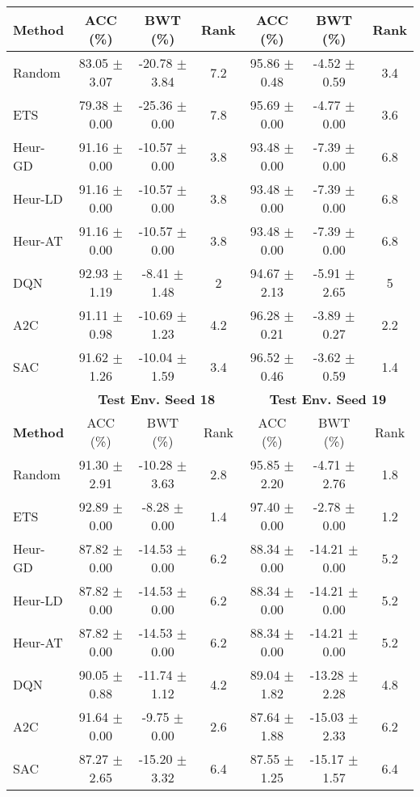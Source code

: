 \begin{tabular}{lcccccc}
	\cmidrule(lr){2-4} \cmidrule(lr){5-7}
	\textbf{Method} & ACC (\%)          & BWT (\%)          & Rank   & ACC (\%)          & BWT (\%)          & Rank   \\
	\midrule 
	Random          & 83.05 $\pm$ 3.07    & -20.78 $\pm$ 3.84   & 7.2    & 95.86 $\pm$ 0.48    & -4.52 $\pm$ 0.59    & 3.4    \\
	ETS             & 79.38 $\pm$ 0.00    & -25.36 $\pm$ 0.00   & 7.8    & 95.69 $\pm$ 0.00    & -4.77 $\pm$ 0.00    & 3.6    \\
	Heur-GD         & 91.16 $\pm$ 0.00    & -10.57 $\pm$ 0.00   & 3.8    & 93.48 $\pm$ 0.00    & -7.39 $\pm$ 0.00    & 6.8    \\
	Heur-LD         & 91.16 $\pm$ 0.00    & -10.57 $\pm$ 0.00   & 3.8    & 93.48 $\pm$ 0.00    & -7.39 $\pm$ 0.00    & 6.8    \\
	Heur-AT         & 91.16 $\pm$ 0.00    & -10.57 $\pm$ 0.00   & 3.8    & 93.48 $\pm$ 0.00    & -7.39 $\pm$ 0.00    & 6.8    \\
	DQN             & 92.93 $\pm$ 1.19    & -8.41 $\pm$ 1.48    & 2      & 94.67 $\pm$ 2.13    & -5.91 $\pm$ 2.65    & 5      \\
	A2C             & 91.11 $\pm$ 0.98    & -10.69 $\pm$ 1.23   & 4.2    & 96.28 $\pm$ 0.21    & -3.89 $\pm$ 0.27    & 2.2    \\
	SAC             & 91.62 $\pm$ 1.26    & -10.04 $\pm$ 1.59   & 3.4    & 96.52 $\pm$ 0.46    & -3.62 $\pm$ 0.59    & 1.4    \\
	\midrule 
	& \multicolumn{3}{c}{\textbf{Test Env. Seed 18}} & \multicolumn{3}{c}{\textbf{Test Env. Seed 19}} \\
	\cmidrule(lr){2-4} \cmidrule(lr){5-7}
	\textbf{Method} & ACC (\%)          & BWT (\%)          & Rank   & ACC (\%)          & BWT (\%)          & Rank   \\
	\midrule 
	Random          & 91.30 $\pm$ 2.91    & -10.28 $\pm$ 3.63   & 2.8    & 95.85 $\pm$ 2.20    & -4.71 $\pm$ 2.76    & 1.8    \\
	ETS             & 92.89 $\pm$ 0.00    & -8.28 $\pm$ 0.00    & 1.4    & 97.40 $\pm$ 0.00    & -2.78 $\pm$ 0.00    & 1.2    \\
	Heur-GD         & 87.82 $\pm$ 0.00    & -14.53 $\pm$ 0.00   & 6.2    & 88.34 $\pm$ 0.00    & -14.21 $\pm$ 0.00   & 5.2    \\
	Heur-LD         & 87.82 $\pm$ 0.00    & -14.53 $\pm$ 0.00   & 6.2    & 88.34 $\pm$ 0.00    & -14.21 $\pm$ 0.00   & 5.2    \\
	Heur-AT         & 87.82 $\pm$ 0.00    & -14.53 $\pm$ 0.00   & 6.2    & 88.34 $\pm$ 0.00    & -14.21 $\pm$ 0.00   & 5.2    \\
	DQN             & 90.05 $\pm$ 0.88    & -11.74 $\pm$ 1.12   & 4.2    & 89.04 $\pm$ 1.82    & -13.28 $\pm$ 2.28   & 4.8    \\
	A2C             & 91.64 $\pm$ 0.00    & -9.75 $\pm$ 0.00    & 2.6    & 87.64 $\pm$ 1.88    & -15.03 $\pm$ 2.33   & 6.2    \\
	SAC             & 87.27 $\pm$ 2.65    & -15.20 $\pm$ 3.32   & 6.4    & 87.55 $\pm$ 1.25    & -15.17 $\pm$ 1.57   & 6.4   \\
	\bottomrule 
\end{tabular}
